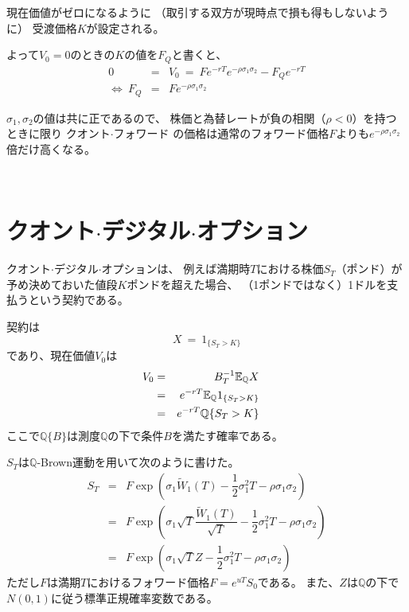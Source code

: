 \documentclass[uplatex,a4j,12pt,dvipdfmx]{jsarticle}
\begin{document}
現在価値がゼロになるように
（取引する双方が現時点で損も得もしないように）
受渡価格$K$が設定される。

よって$V_{0}=0$のときの$K$の値を$F_{Q}$と書くと、
%
%
\begin{eqnarray}
	0 &=& V_{0}
	\ = \
	F
	e^{-rT}
	e^{- \rho \sigma_{1} \sigma_{2}}
	-
	F_{Q} e^{-rT}
	\\
	\Longleftrightarrow
	\
	F_{Q}
	&=&
	F
	e^{- \rho \sigma_{1} \sigma_{2}}
\end{eqnarray}
%
%

$\sigma_{1},\sigma_{2}$の値は共に正であるので、
株価と為替レートが負の相関（$\rho < 0$）を持つときに限り
クオント$\cdot$フォワード
の価格は通常のフォワード価格$F$よりも$e^{- \rho \sigma_{1} \sigma_{2}}$倍だけ高くなる。


\ \\[-10mm]

\section{クオント$\cdot$デジタル$\cdot$オプション}

クオント$\cdot$デジタル$\cdot$オプションは、
例えば満期時$T$における株価$S_{T}$（ポンド）が
予め決めておいた値段$K$ポンドを超えた場合、
（1ポンドではなく）1ドルを支払うという契約である。

契約は
$$
	X
	\ = \
	1_{ \{ S_{T}>K \} }
$$
であり、現在価値$V_{0}$は
%
%
\begin{eqnarray}
	\hspace{-10mm}
	V_{0}
	& = &
	B^{-1}_{T}
	\mathbb{E}_{\mathbb{Q}}
	X
	\\ & = &
	e^{-rT}
	\mathbb{E}_{\mathbb{Q}}
	1_{ \{ S_{T}>K \} }
	\\ & = &
	e^{-rT}
	\mathbb{Q}
	\{ S_{T}>K \}
\end{eqnarray}
%
%
ここで$\mathbb{Q}\{B\}$は測度$\mathbb{Q}$の下で条件$B$を満たす確率である。

$S_{T}$は$\mathbb{Q}$-Brown運動を用いて次のように書けた。
%
%
\begin{eqnarray}
	S_{T}
	&=&
	F
	\exp \left( \sigma_{1} \tilde{W}_{1}(T) -
	\dfrac{1}{2} \sigma_{1}^{2} T -
	\rho \sigma_{1} \sigma_{2}
	\right)
	\\ &=&
	F
	\exp \left( \sigma_{1} \sqrt{T} \dfrac{ \tilde{W}_{1}(T) }{ \sqrt{T} } -
	\dfrac{1}{2} \sigma_{1}^{2} T -
	\rho \sigma_{1} \sigma_{2} \right)
	\\ &=&
	F
	\exp \left( \sigma_{1} \sqrt{T} Z -
	\dfrac{1}{2} \sigma_{1}^{2} T  -
	\rho \sigma_{1} \sigma_{2}\right)
\end{eqnarray}
%
%
ただし$F$は満期$T$におけるフォワード価格$F = e^{uT} S_{0}$である。
また、$Z$は$\mathbb{Q}$の下で$N(0,1)$に従う標準正規確率変数である。
\end{document}
